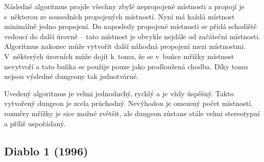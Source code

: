 Následně algoritmus projde všechny zbylé nepropojené místnosti a propojí je s~některou ze sousedních propojených místností.
Nyní má každá místnost minimálně jedno propojení.
Do naposledy propojené místnosti se přidá schodiště vedoucí do další úrovně -- tato místnost je obvykle nejdále od začáteční místnosti.
Algoritmus nakonec může vytvořit další náhodná propojení mezi místnostmi.
V~některých úrovních může dojít k~tomu, že se v~buňce mřížky místnost nevytvoří a tato buňka se použije pouze jako prodloužená chodba.
Díky tomu nejsou výsledné dungeony tak jednotvárné\cite{lit:rogue}.
\par
Uvedený algoritmus je velmi jednoduchý, rychlý a je vždy úspěšný.
Takto vytvořený dungeon je zcela průchodný.
Nevýhodou je omezený počet místností, rozměry mřížky je sice možné zvětšit, ale dungeon zůstane stále velmi stereotypní a příliš uspořádaný.


\subsection{Diablo 1 (1996)}


